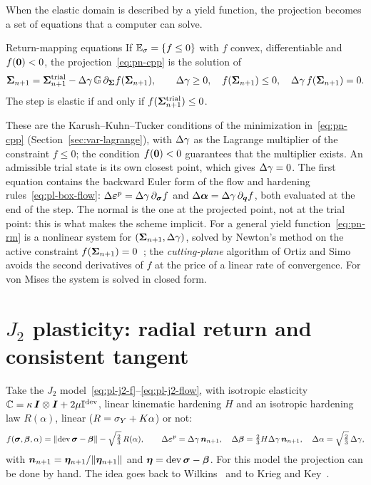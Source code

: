 When the elastic domain is described by a yield function, the projection
becomes a set of equations that a computer can solve.
\begin{gbox}{Return-mapping equations}\label{cor:pn-rm}
%
If $\mathbb{E}_{\sigma}=\{f\le0\}$ with $f$ convex, differentiable and $f(\bm{0})<0$, the
projection~\eqref{eq:pn-cpp} is the solution of
\begin{equation}\label{eq:pn-rm}
  \bm{\Sigma}_{n+1}=\bm{\Sigma}^{\mathrm{trial}}_{n+1}-\Delta\gamma\,\mathbb{G}\,\partial_{\bm{\Sigma}}f(\bm{\Sigma}_{n+1}),\qquad
  \Delta\gamma\ge0,\quad f(\bm{\Sigma}_{n+1})\le0,\quad\Delta\gamma\,f(\bm{\Sigma}_{n+1})=0 .
\end{equation}
The step is elastic if and only if $f(\bm{\Sigma}^{\mathrm{trial}}_{n+1})\le0$.
\end{gbox}
\noindent These are the Karush--Kuhn--Tucker conditions of the minimization
in~\eqref{eq:pn-cpp} (Section~\ref{sec:var-lagrange}), with $\Delta\gamma$ as the
Lagrange multiplier of the constraint $f\le0$; the condition $f(\bm{0})<0$
guarantees that the multiplier exists. An admissible trial state is its own
closest point, which gives $\Delta\gamma=0$. The first equation contains the backward Euler form of the flow and
hardening rules~\eqref{eq:pl-box-flow}: $\Delta\bm{\varepsilon}^{p}=\Delta\gamma\,\partial_{\bm{\sigma}}f$ and
$\Delta\bm{\alpha}=\Delta\gamma\,\partial_{\bm{q}}f$, both evaluated at the end of the step. The
normal is the one at the projected point, not at the trial point: this is
what makes the scheme implicit. For a general yield function~\eqref{eq:pn-rm}
is a nonlinear system for $(\bm{\Sigma}_{n+1},\Delta\gamma)$, solved by Newton's method on the
active constraint $f(\bm{\Sigma}_{n+1})=0$~\cite[Sec.~3.2]{SimoHughesCI}; the
\emph{cutting-plane} algorithm of Ortiz and Simo~\cite{OrtizSimo1986} avoids
the second derivatives of $f$ at the price of a linear rate of convergence.
For von Mises the system is solved in closed form.

\section{\texorpdfstring{$J_2$}{J2} plasticity: radial return and consistent tangent}\label{sec:pn-j2}
%
Take the $J_2$ model~\eqref{eq:pl-j2-f}--\eqref{eq:pl-j2-flow}, with isotropic
elasticity $\mathbb{C}=\kappa\,\bm{I}\otimes\bm{I}+2\mu\mathbb{I}^{\mathrm{dev}}$, linear kinematic hardening
$H$ and an isotropic hardening law $R(\alpha)$, linear ($R=\sigma_{Y}+K\alpha$) or not:
\[
  f(\bm{\sigma},\bm{\beta},\alpha)=\lVert \operatorname{dev}\bm{\sigma}-\bm{\beta}\rVert-\sqrt{\tfrac23}\,R(\alpha),\qquad
  \Delta\bm{\varepsilon}^{p}=\Delta\gamma\,\bm{n}_{n+1},\quad \Delta\bm{\beta}=\tfrac23H\Delta\gamma\,\bm{n}_{n+1},\quad
  \Delta\alpha=\sqrt{\tfrac23}\,\Delta\gamma,
\]
with $\bm{n}_{n+1}=\bm{\eta}_{n+1}/\lVert \bm{\eta}_{n+1}\rVert$ and $\bm{\eta}=\operatorname{dev}\bm{\sigma}-\bm{\beta}$. For
this model the projection can be done by hand. The idea goes back to
Wilkins~\cite{Wilkins1964} and to Krieg and Key~\cite{KriegKey1976}.

